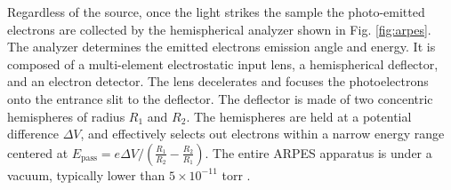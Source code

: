 \documentclass[12pt]{article}
\begin{document}
Regardless of the source, once the light strikes the sample the photo-emitted electrons are collected by the hemispherical analyzer shown in Fig. \ref{fig:arpes}.
The analyzer determines the emitted electrons emission angle and energy.
It is composed of a multi-element electrostatic input lens, a hemispherical deflector, and an electron detector.
The lens decelerates and focuses the photoelectrons onto the entrance slit to the deflector.
The deflector is made of two concentric hemispheres of radius $R_1$ and $R_2$.
The hemispheres are held at a potential difference $\Delta V$, and effectively selects out electrons within a narrow energy range centered at $E_{\text{pass}}=e\Delta V / (\frac{R_1}{R_2}-\frac{R_2}{R_1})$.
The entire ARPES apparatus is under a vacuum, typically lower than $5\times10^{-11}$ torr \cite{Damascelli}.
\end{document}
